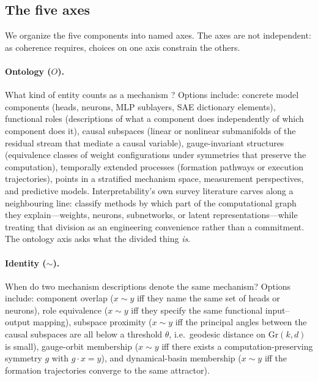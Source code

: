 \documentclass{article}
\newcommand{\Gr}{\mathrm{Gr}}
\begin{document}
\subsection{The five axes}\label{sec:axes}

We organize the five components into named axes.  The axes are not
independent: as coherence requires, choices on one axis constrain the
others.

\paragraph{Ontology ($O$).}
What kind of entity counts as a mechanism \citep{quine1948}?
Options include: concrete
model components (heads, neurons, MLP sublayers, SAE dictionary
elements), functional roles (descriptions of what a component does
independently of which component does it), causal subspaces (linear or
nonlinear submanifolds of the residual stream that mediate a causal
variable), gauge-invariant structures (equivalence classes of weight
configurations under symmetries that preserve the computation),
temporally extended processes (formation pathways or execution
trajectories), points in a stratified mechanism space, measurement
perspectives, and predictive models.
  Interpretability's own survey literature carves along a neighbouring line: \citet{rauker2023} classify methods by which part of the computational graph they explain---weights, neurons, subnetworks, or latent representations---while treating that division as an engineering convenience rather than a commitment.  The ontology axis asks what the divided thing \emph{is}.

\paragraph{Identity ($\sim$).}
When do two mechanism descriptions denote the same mechanism?  Options
include: component overlap ($x \sim y$ iff they name the same set of
heads or neurons), role equivalence ($x \sim y$ iff they specify the
same functional input--output mapping), subspace proximity ($x \sim y$
iff the principal angles between the causal subspaces are all below a
threshold $\theta$, i.e.\ geodesic distance on $\Gr(k,d)$ is small),
gauge-orbit membership ($x \sim y$ iff there exists a computation-preserving
symmetry $g$ with $g \cdot x = y$), and dynamical-basin membership
($x \sim y$ iff the formation trajectories converge to the same
attractor).
\end{document}
